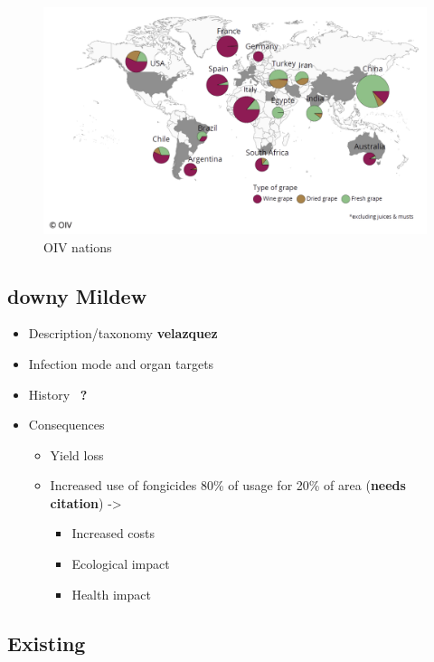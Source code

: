 \documentclass[english]{article}
\begin{document}
\begin{figure}[H]
	\begin{center}
		\includegraphics[width=0.7\linewidth]{2023_cdt_oiv_world.png}
		\caption{OIV nations}\label{fig:oivworld}
	\end{center}
\end{figure}

\subsection{downy Mildew}

\begin{itemize}
	\item Description/taxonomy \textbf{velazquez} 
	\item Infection mode and organ targets
	\item History~\parencite*{fontaineEuropeBridgeheadWorldwide2021} \textbf{?}
	\item Consequences
	      \begin{itemize}
		      \item Yield loss
		      \item Increased use of fongicides 80\% of usage for 20\% of area (\textbf{needs citation}) ->
		            \begin{itemize}
			            \item Increased costs
			            \item Ecological impact
			            \item Health impact
		            \end{itemize}
	      \end{itemize}
\end{itemize}

\subsection{Existing}
\end{document}
